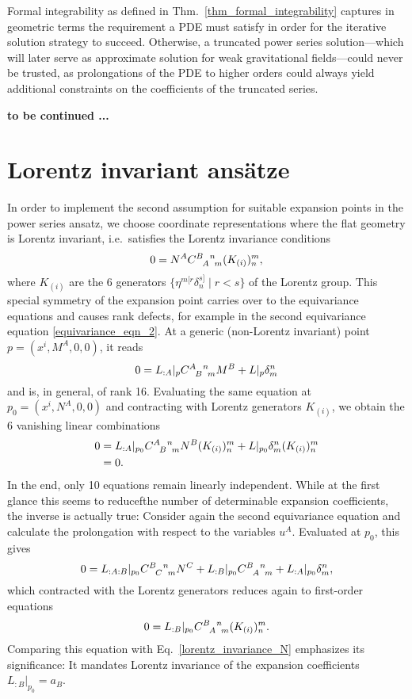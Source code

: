 Formal integrability as defined in Thm.~\ref{thm_formal_integrability} captures in geometric terms the requirement a PDE must satisfy in order for the iterative solution strategy to succeed. Otherwise, a truncated power series solution---which will later serve as approximate solution for weak gravitational fields---could never be trusted, as prolongations of the PDE to higher orders could always yield additional constraints on the coefficients of the truncated series.

\textbf{to be continued ...}

\section{Lorentz invariant ansätze}

In order to implement the second assumption for suitable expansion points in the power series ansatz, we choose coordinate representations where the flat geometry is Lorentz invariant, i.e.~satisfies the Lorentz invariance conditions
\begin{equation}\label{lorentz_invariance_N}
  0 = N^A \gmc{B}{A}{n}{m} (K_{(i)})^m_n,
\end{equation}
where $K_{(i)}$ are the 6 generators $\{ \eta^{m\lbrack r}\delta^{s\rbrack}_n \mid r < s \}$ of the Lorentz group. This special symmetry of the expansion point carries over to the equivariance equations and causes rank defects, for example in the second equivariance equation \eqref{equivariance_eqn_2}. At a generic (non-Lorentz invariant) point $p=(x^i,M^A,0,0)$, it reads
\begin{equation}
  0 = L_{:A}\rvert_p \gmc{A}{B}{n}{m} M^B + L\rvert_p \delta^n_m
\end{equation}
and is, in general, of rank 16. Evaluating the same equation at $p_0 = (x^i,N^A,0,0)$ and contracting with Lorentz generators $K_{(i)}$, we obtain the 6 vanishing linear combinations
\begin{equation}
  \begin{aligned}
    0 &{} = L_{:A}\rvert_{p_0} \gmc{A}{B}{n}{m} N^B (K_{(i)})^m_n + L\rvert_{p_0} \delta^n_m (K_{(i)})^m_n \\
      &{} = 0.
  \end{aligned}
\end{equation}
In the end, only 10 equations remain linearly independent. While at the first glance this seems to reducefthe number of determinable expansion coefficients, the inverse is actually true: Consider again the second equivariance equation and calculate the prolongation with respect to the variables $u^A$. Evaluated at $p_0$, this gives
\begin{equation}
  0 = L_{:A:B}\rvert_{p_0} \gmc{B}{C}{n}{m} N^C + L_{:B}\rvert_{p_0} \gmc{B}{A}{n}{m} + L_{:A}\rvert_{p_0} \delta^n_m,
\end{equation}
which contracted with the Lorentz generators reduces again to first-order equations
\begin{equation}
  0 = L_{:B}\rvert_{p_0}\gmc{B}{A}{n}{m}(K_{(i)})^m_n.
\end{equation}
Comparing this equation with Eq.~\ref{lorentz_invariance_N} emphasizes its significance: It mandates Lorentz invariance of the expansion coefficients $L_{:B}\rvert_{p_0} = a_B$.

